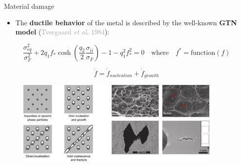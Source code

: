 \documentclass[9pt]{beamer}
\begin{document}

\begin{frame}{Material damage}

    \begin{itemize}
        \item The \textbf{ductile behavior} of the metal is described by the well-known \textbf{GTN model} (\textcolor{darkgray}{Tvergaard \textit{et al.} 1984}):
     \end{itemize}

        $$ \displaystyle \frac{\sigma_{eq}^2}{\sigma_F^2} + 2 q_1 f_* \cosh \left(\frac{q_2}{2} \frac{\sigma_{ii}}{\sigma_F}\right) - 1 -q_1^2 f_*^2 = 0 \quad \textrm{where} \quad f^* = \textrm{function}(f) $$ 

        \vspace{0.15cm}

        $$ \displaystyle \dot{f} = \dot{f}_{nucleation} + \dot{f}_{growth} $$

        \vspace{0.15cm}

        \begin{figure}
            \centering
            \includegraphics[width=0.9\textwidth]{Images/damage_evolution.pdf}
        \end{figure}
        
\end{frame}

\end{document}
